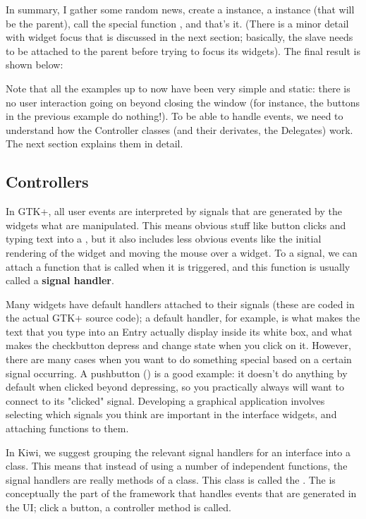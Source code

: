 \documentclass[a4paper]{howto}
\begin{document}
In summary, I gather some random news, create a 
instance, a  instance (that will be the parent), call
the special function , and that's it. (There is a
minor detail with widget focus that is discussed in the next section;
basically, the slave needs to be attached to the parent before trying to
focus its widgets).  The final result is shown below:


Note that all the examples up to now have been very simple and static:
there is no user interaction going on beyond closing the window (for
instance, the buttons in the previous example do nothing!). To be able
to handle events, we need to understand how the Controller classes (and
their derivates, the Delegates) work. The next section explains them in
detail.

\subsection{Controllers}
\label{callbacks}

In GTK+, all user events are interpreted by signals that are generated
by the widgets what are manipulated. This means obvious stuff like
button clicks and typing text into a , but it also
includes less obvious events like the initial rendering of the widget
and moving the mouse over a widget. To a signal, we can attach a
function that is called when it is triggered, and this function is
usually called a {\bf signal handler}.

Many widgets have default handlers attached to their signals (these are
coded in the actual GTK+ source code); a default handler, for example,
is what makes the text that you type into an Entry actually display
inside its white box, and what makes the checkbutton depress and change
state when you click on it. However, there are many cases when you want
to do something special based on a certain signal occurring. A pushbutton
() is a good example: it doesn't do anything by default
when clicked beyond depressing, so you practically always will want to
connect to its "clicked" signal. Developing a graphical application
involves selecting which signals you think are important in the
interface widgets, and attaching functions to them.

In Kiwi, we suggest grouping the relevant signal handlers for an
interface into a class. This means that instead of using a number of
independent functions, the signal handlers are really methods of
a class. This class is called the . The
 is conceptually the part of the framework that
handles events that are generated in the UI; click a button, a
controller method is called.
\end{document}
